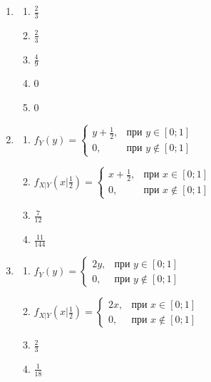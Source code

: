 \begin{enumerate}
\item
\begin{enumerate}
\item $\frac{2}{3}$

\item $\frac{2}{3}$

\item $\frac{4}{9}$

\item 0

\item 0
\end{enumerate}

\item
\begin{enumerate}
\item $f_{Y}(y) = \begin{cases} y+\frac{1}{2}, & \text{при } y \in [0;1] \\ 0 , & \text{при } y \not\in [0;1] \end{cases}$

\item $f_{X|Y}(x|\frac{1}{2}) = \begin{cases} x+\frac{1}{2}, & \text{при } x \in [0;1] \\ 0 , & \text{при } x \not\in [0;1] \end{cases}$

\item $\frac{7}{12}$

\item $\frac{11}{144}$
\end{enumerate}

\item
\begin{enumerate}
\item $f_{Y}(y) = \begin{cases} 2y, & \text{при } y \in [0;1] \\ 0 , & \text{при } y \not\in [0;1] \end{cases}$

\item $f_{X|Y}(x|\frac{1}{2}) = \begin{cases} 2x, & \text{при } x \in [0;1] \\ 0 , & \text{при } x \not\in [0;1] \end{cases}$

\item $\frac{2}{3}$

\item $\frac{1}{18}$
\end{enumerate}
\end{enumerate}

